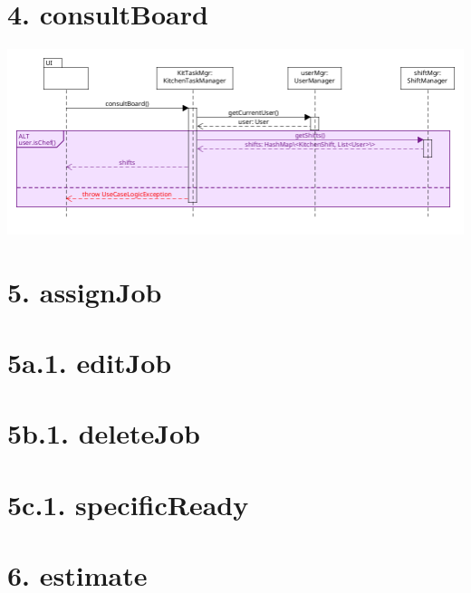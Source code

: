 \pagebreak

\section*{4. consultBoard}

\begin{center}
  \includegraphics[scale = 0.45]{images/DSD/DSD 4.png}
\end{center}

\pagebreak

\section*{5. assignJob}

\pagebreak

\section*{5a.1. editJob}

\pagebreak

\section*{5b.1. deleteJob}

\pagebreak

\section*{5c.1. specificReady}

\pagebreak

\section*{6. estimate}

\pagebreak
